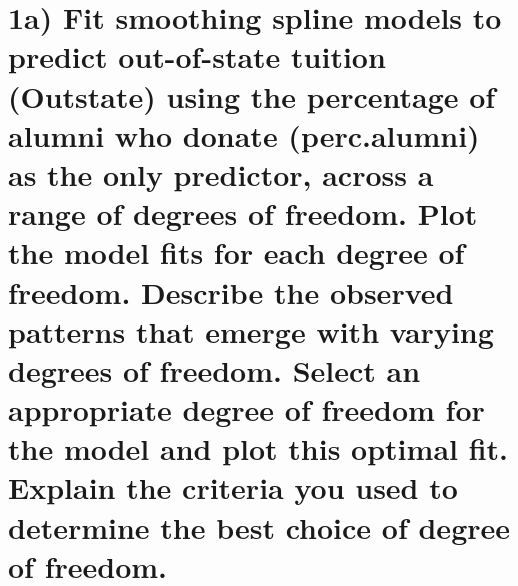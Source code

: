 \documentclass[
]{article}
\begin{document}
\hypertarget{a-fit-smoothing-spline-models-to-predict-out-of-state-tuition-outstate-using-the-percentage-of-alumni-who-donate-perc.alumni-as-the-only-predictor-across-a-range-of-degrees-of-freedom.-plot-the-model-fits-for-each-degree-of-freedom.-describe-the-observed-patterns-that-emerge-with-varying-degrees-of-freedom.-select-an-appropriate-degree-of-freedom-for-the-model-and-plot-this-optimal-fit.-explain-the-criteria-you-used-to-determine-the-best-choice-of-degree-of-freedom.}{%
\section{1a) Fit smoothing spline models to predict out-of-state tuition
(Outstate) using the percentage of alumni who donate (perc.alumni) as
the only predictor, across a range of degrees of freedom. Plot the model
fits for each degree of freedom. Describe the observed patterns that
emerge with varying degrees of freedom. Select an appropriate degree of
freedom for the model and plot this optimal fit. Explain the criteria
you used to determine the best choice of degree of
freedom.}\label{a-fit-smoothing-spline-models-to-predict-out-of-state-tuition-outstate-using-the-percentage-of-alumni-who-donate-perc.alumni-as-the-only-predictor-across-a-range-of-degrees-of-freedom.-plot-the-model-fits-for-each-degree-of-freedom.-describe-the-observed-patterns-that-emerge-with-varying-degrees-of-freedom.-select-an-appropriate-degree-of-freedom-for-the-model-and-plot-this-optimal-fit.-explain-the-criteria-you-used-to-determine-the-best-choice-of-degree-of-freedom.}}
\end{document}
